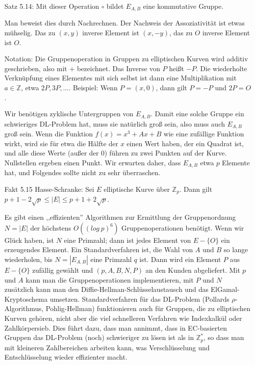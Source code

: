 \documentclass[a4paper]{article}
\begin{document}
\begin{multicols}{3}
        Satz 5.14: Mit dieser Operation $\circ$ bildet $E_{A,B}$ eine kommutative Gruppe.

        Man beweist dies durch Nachrechnen. Der Nachweis der Assoziativität ist etwas mühselig. Das zu $(x,y)$ inverse Element ist $(x,-y)$, das zu $O$ inverse Element ist $O$.

        Notation: Die Gruppenoperation in Gruppen zu elliptischen Kurven wird additiv geschrieben, also mit $+$ bezeichnet. Das Inverse von $P$ heißt $-P$. Die wiederholte Verknüpfung eines Elementes mit sich selbst ist dann eine Multiplikation mit $a\in\mathbb{Z}$, etwa $2P, 3P,...$.
        Beispiel: Wenn $P=(x,0)$, dann gilt $P=-P$ und $2P=O$.

        Wir benötigen zyklische Untergruppen von $E_{A,B}$. Damit eine solche Gruppe ein schwieriges DL-Problem hat, muss sie natürlich groß sein, also muss auch $E_{A,B}$ groß sein. Wenn die Funktion $f(x) =x^3+Ax+B$ wie eine zufällige Funktion wirkt, wird sie für etwa die Hälfte der $x$ einen Wert haben, der ein Quadrat ist, und alle diese Werte (außer der $0$) führen zu zwei Punkten auf der Kurve. Nullstellen ergeben einen Punkt. Wir erwarten daher, dass $E_{A,B}$ etwa $p$ Elemente hat, und Folgendes sollte nicht zu sehr überraschen.

        Fakt 5.15 Hasse-Schranke: Sei $E$ elliptische Kurve über $\mathbb{Z}_p$. Dann gilt $p+ 1- 2\sqrt{p}\leq |E|\leq p+1 + 2\sqrt{p}$.

        Es gibt einen ,,effizienten'' Algorithmen zur Ermittlung der Gruppenordnung $N=|E|$ der höchstens $O((log\ p)^6)$ Gruppenoperationen benötigt. Wenn wir Glück haben, ist $N$ eine Primzahl; dann ist jedes Element von $E-\{O\}$ ein erzeugendes Element. Ein Standardverfahren ist, die Wahl von $A$ und $B$ so lange wiederholen, bis $N=|E_{A,B}|$ eine Primzahl $q$ ist. Dann wird ein Element $P$ aus $E-\{O\}$ zufällig gewählt und $(p,A,B,N,P)$ an den Kunden abgeliefert. Mit $p$ und $A$ kann man die Gruppenoperationen implementieren, mit $P$ und $N$ zusätzlich kann man den Diffie-Hellman-Schlüsselaustausch und das ElGamal-Kryptoschema umsetzen.
        Standardverfahren für das DL-Problem (Pollards ${\rho}$-Algorithmus, Pohlig-Hellman) funktionieren auch für Gruppen, die zu elliptischen Kurven gehören, nicht aber die viel schnelleren Verfahren wie Indexkalkül oder Zahlkörpersieb. Dies führt dazu, dass man annimmt, dass in EC-basierten Gruppen das DL-Problem (noch) schwieriger zu lösen ist als in $\mathbb{Z}^*_p$, so dass man mit kleineren Zahlbereichen arbeiten kann, was Verschlüsselung und Entschlüsselung wieder effizienter macht.


\end{multicols}
\end{document}
